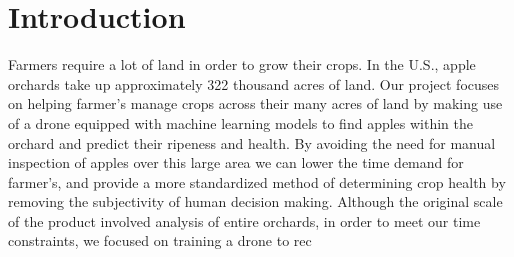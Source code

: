 \section{Introduction}
Farmers require a lot of land in order to grow their crops.  %
In the U.S., apple orchards take up approximately 322 thousand acres of land. %
Our project focuses on helping farmer's manage crops across their many acres of land by making use of a drone equipped with machine learning models to 
find apples within the orchard and predict their ripeness and health. By avoiding the need for manual inspection of apples over this large area 
we can lower the time demand for farmer's, and provide a more standardized method of determining crop health by removing the subjectivity of human decision making.
Although the original scale of the product involved analysis of entire orchards, in order to meet our time constraints, we focused on training a drone to rec
\\
